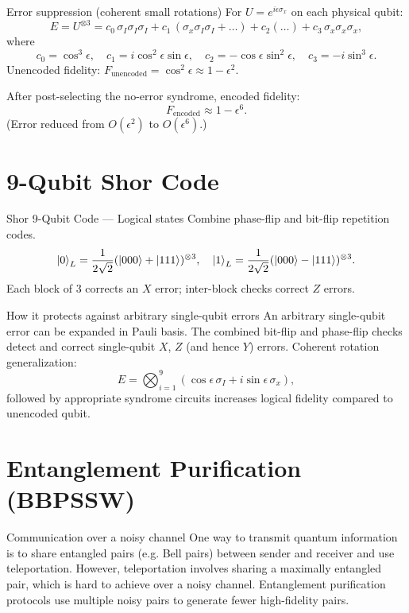 \documentclass[10pt]{beamer}
\begin{document}
\begin{frame}{Error suppression (coherent small rotations)}
  For \(U=e^{i\epsilon \sigma_x}\) on each physical qubit:
  \[
    E = U^{\otimes 3} = c_0\,\sigma_I\sigma_I\sigma_I
      + c_1\,(\sigma_x\sigma_I\sigma_I + \dots) + c_2(\dots) + c_3\,\sigma_x\sigma_x\sigma_x,
  \]
  where
  \[
    c_0=\cos^3\epsilon,\quad c_1=i\cos^2\epsilon\sin\epsilon,\quad c_2=-\cos\epsilon\sin^2\epsilon,\quad c_3=-i\sin^3\epsilon.
  \]
  Unencoded fidelity: \(F_{\text{unencoded}}=\cos^2\epsilon\approx 1-\epsilon^2\).
  
  After post-selecting the no-error syndrome, encoded fidelity:
  \[
    F_{\text{encoded}}\approx 1-\epsilon^6.
  \]
  (Error reduced from \(O(\epsilon^2)\) to \(O(\epsilon^6)\).)
\end{frame}

\section{9-Qubit Shor Code}
\begin{frame}{Shor 9-Qubit Code — Logical states}
  Combine phase-flip and bit-flip repetition codes.
  \[
    \ket{0}_L = \frac{1}{2\sqrt{2}} ( \ket{000}+\ket{111} )^{\otimes 3},\quad
    \ket{1}_L = \frac{1}{2\sqrt{2}} ( \ket{000}-\ket{111} )^{\otimes 3}.
  \]
  Each block of 3 corrects an \(X\) error; inter-block checks correct \(Z\) errors.
\end{frame}

\begin{frame}{How it protects against arbitrary single-qubit errors}
  An arbitrary single-qubit error can be expanded in Pauli basis.
  The combined bit-flip and phase-flip checks detect and correct single-qubit \(X\), \(Z\) (and hence \(Y\)) errors.
  Coherent rotation generalization:
  \[
    E=\bigotimes_{i=1}^{9}(\cos\epsilon\,\sigma_I + i\sin\epsilon\,\sigma_x),
  \]
  followed by appropriate syndrome circuits increases logical fidelity compared to unencoded qubit.
\end{frame}

\section{Entanglement Purification (BBPSSW)}
\begin{frame}{Communication over a noisy channel}
  One way to transmit quantum information is to share entangled pairs (e.g. Bell pairs) between sender and receiver and use teleportation. However, teleportation involves sharing a maximally entangled pair, which is hard to achieve over a noisy channel. Entanglement purification protocols use multiple noisy pairs to generate fewer high-fidelity pairs.
\end{frame}
\end{document}
